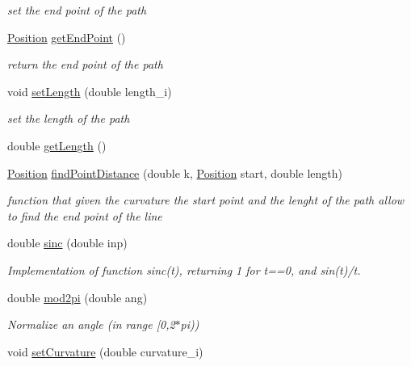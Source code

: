 \begin{DoxyCompactItemize}
\begin{DoxyCompactList}\small\item\em set the end point of the path \end{DoxyCompactList}\item 
\mbox{\hyperlink{class_position}{Position}} \mbox{\hyperlink{class_line_a5f22705f0019c1f855f095ea6b7c4b45}{get\+End\+Point}} ()
\begin{DoxyCompactList}\small\item\em return the end point of the path \end{DoxyCompactList}\item 
void \mbox{\hyperlink{class_line_a387afc9536a3c054dec9eb54f45ea993}{set\+Length}} (double length\+\_\+i)
\begin{DoxyCompactList}\small\item\em set the length of the path \end{DoxyCompactList}\item 
double \mbox{\hyperlink{class_line_a9f91895c2a71dcb2c8da5dd5b057b14a}{get\+Length}} ()
\item 
\mbox{\hyperlink{class_position}{Position}} \mbox{\hyperlink{class_line_a983c7c0071d48eb33644f9da8bc0050b}{find\+Point\+Distance}} (double k, \mbox{\hyperlink{class_position}{Position}} start, double length)
\begin{DoxyCompactList}\small\item\em function that given the curvature the start point and the lenght of the path allow to find the end point of the line \end{DoxyCompactList}\item 
double \mbox{\hyperlink{class_line_a4976ad80d3fe4a789bac7a1916543edd}{sinc}} (double inp)
\begin{DoxyCompactList}\small\item\em Implementation of function sinc(t), returning 1 for t==0, and sin(t)/t. \end{DoxyCompactList}\item 
double \mbox{\hyperlink{class_line_aa30f3bd50c4de544874c4aaad0a24c6a}{mod2pi}} (double ang)
\begin{DoxyCompactList}\small\item\em Normalize an angle (in range \mbox{[}0,2$\ast$pi)) \end{DoxyCompactList}\item 
\mbox{\label{class_line_aad0f35e79a42a1fa32f6319c5f0d6f2c}} 
void \mbox{\hyperlink{class_line_aad0f35e79a42a1fa32f6319c5f0d6f2c}{set\+Curvature}} (double curvature\+\_\+i)

\end{DoxyCompactItemize}
